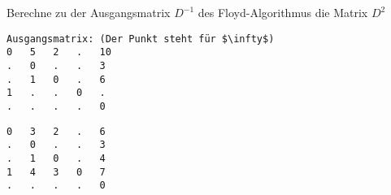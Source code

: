 ﻿\question[6]
Berechne zu der Ausgangsmatrix $D^{-1}$ des Floyd-Algorithmus
die Matrix $D^2$
\begin{lstlisting}
Ausgangsmatrix: (Der Punkt steht für $\infty$)
0   5   2   .   10
.   0   .   .   3
.   1   0   .   6
1   .   .   0   .
.   .   .   .   0
\end{lstlisting}

\begin{solutionbox}{6cm}
\begin{lstlisting}
0   3   2   .   6
.   0   .   .   3
.   1   0   .   4
1   4   3   0   7
.   .   .   .   0
\end{lstlisting}
\end{solutionbox}
